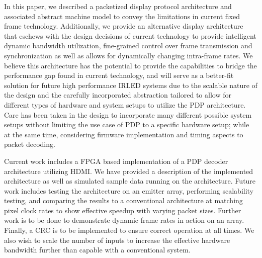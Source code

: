 \label{chap:conclusion}
In this paper, we described a packetized display protocol architecture and associated abstract machine model to convey the limitations in current fixed frame technology. Additionally, we provide an alternative display architecture that eschews with the design decisions of current technology to provide intelligent dynamic bandwidth utilization, fine-grained control over frame transmission and synchronization as well as allows for dynamically changing intra-frame rates. We believe this architecture has the potential to provide the capabilities to bridge the performance gap found in current technology, and will serve as a better-fit solution for future high performance IRLED systems due to the scalable nature of the design and the carefully incorporated abstraction tailored to allow for different types of hardware and system setups to utilize the PDP architecture. Care has been taken in the design to incorporate many different possible system setups without limiting the use case of PDP to a specific hardware setup; while at the same time, considering firmware implementation and timing aspects to packet decoding.

Current work includes a FPGA based implementation of a PDP decoder architecture utilizing HDMI. We have provided a description of the implemented architecture as well as simulated sample data running on the architecture. Future work includes testing the architecture on an emitter array, performing scalability testing, and comparing the results to a conventional architecture at matching pixel clock rates to show effective speedup with varying packet sizes. Further work is to be done to demonstrate dynamic frame rates in action on an array. Finally, a CRC is to be implemented to ensure correct operation at all times. We also wish to scale the number of inputs to increase the effective hardware bandwidth further than capable with a conventional system.
